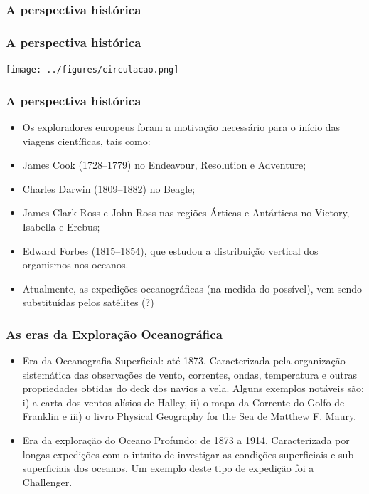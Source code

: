 \begin{frame}
    \frametitle{A perspectiva histórica}
    \centerline{}
\end{frame}

\begin{frame}
    \frametitle{A perspectiva histórica}
    \centerline{\texttt{[image: ../figures/circulacao.png]}}
\end{frame}

\begin{frame}
    \frametitle{A perspectiva histórica}
\small{
    \begin{itemize}[<+-| alert@+>]
        \item Os exploradores europeus foram a motivação necessário para o início
            das viagens científicas, tais como:
        \item James Cook (1728--1779) no Endeavour, Resolution e Adventure;
        \item Charles Darwin (1809--1882) no Beagle;
        \item James Clark Ross e John Ross nas regiões Árticas e Antárticas no
            Victory, Isabella e Erebus;
        \item Edward Forbes (1815--1854), que estudou a distribuição vertical dos
            organismos nos oceanos.
        \item Atualmente, as expedições oceanográficas (na medida do possível),
              vem sendo substituídas pelos satélites (?)
    \end{itemize}
}
\end{frame}

\begin{frame}
    \frametitle{As eras da Exploração Oceanográfica}
\small{
    \begin{itemize}[<+-| alert@+>]
        \item Era da Oceanografia Superficial: até 1873. Caracterizada pela
              organização sistemática das observações de vento, correntes,
              ondas, temperatura e outras propriedades obtidas do deck dos
              navios a vela.  Alguns exemplos notáveis são: i) a carta dos
              ventos alísios de Halley, ii) o mapa da Corrente do Golfo de
              Franklin e iii) o livro Physical Geography for the Sea de Matthew
              F. Maury.
        \item Era da exploração do Oceano Profundo: de 1873 a 1914.
        Caracterizada por longas expedições com o intuito de investigar as
        condições superficiais e sub-superficiais dos oceanos. Um exemplo
        deste tipo de expedição foi a Challenger.
    \end{itemize}
}
\end{frame}

